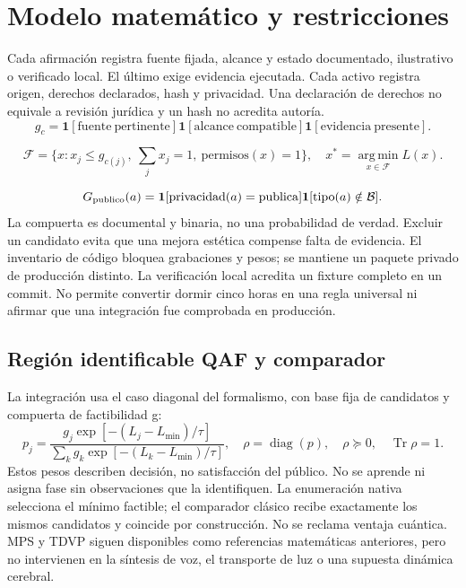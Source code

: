 \documentclass[10pt,a4paper]{article}
\begin{document}
\section{Modelo matemático y restricciones}
Cada afirmación registra fuente fijada, alcance y estado documentado, ilustrativo o verificado local. El último exige evidencia ejecutada. Cada activo registra origen, derechos declarados, hash y privacidad. Una declaración de derechos no equivale a revisión jurídica y un hash no acredita autoría.
\begin{equation}g_c=\mathbf1[\mathrm{fuente\ pertinente}]\mathbf1[\mathrm{alcance\ compatible}]\mathbf1[\mathrm{evidencia\ presente}].\end{equation}

\begin{equation}\mathcal F=\{x:x_j\leq g_{c(j)},\ \sum_jx_j=1,\ \mathrm{permisos}(x)=1\},\quad x^*=\operatorname*{arg\,min}_{x\in\mathcal F}L(x).\end{equation}

\begin{equation}G_{\rm publico}(a)=\mathbf1[\mathrm{privacidad}(a)=\mathrm{publica}]\mathbf1[\mathrm{tipo}(a)\notin\mathcal B].\end{equation}
La compuerta es documental y binaria, no una probabilidad de verdad. Excluir un candidato evita que una mejora estética compense falta de evidencia. El inventario de código bloquea grabaciones y pesos; se mantiene un paquete privado de producción distinto. La verificación local acredita un fixture completo en un commit. No permite convertir dormir cinco horas en una regla universal ni afirmar que una integración fue comprobada en producción.
\subsection{Región identificable QAF y comparador}
La integración usa el caso diagonal del formalismo, con base fija de candidatos y compuerta de factibilidad g:
\begin{equation}
p_j=\frac{g_j\exp[-(L_j-L_{\min})/\tau]}{\sum_k g_k\exp[-(L_k-L_{\min})/\tau]},\quad\rho=\operatorname{diag}(p),\quad\rho\succeq0,\quad\operatorname{Tr}\rho=1.
\end{equation}
Estos pesos describen decisión, no satisfacción del público. No se aprende ni asigna fase sin observaciones que la identifiquen. La enumeración nativa selecciona el mínimo factible; el comparador clásico recibe exactamente los mismos candidatos y coincide por construcción. No se reclama ventaja cuántica. MPS y TDVP siguen disponibles como referencias matemáticas anteriores, pero no intervienen en la síntesis de voz, el transporte de luz o una supuesta dinámica cerebral.
\end{document}
